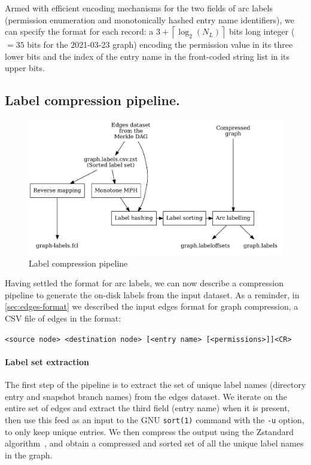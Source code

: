 Armed with efficient encoding mechanisms for the two fields of arc labels
(permission enumeration and monotonically hashed entry name identifiers), we
can specify the format for each record: a $3 +
\left\lceil{\log_2(N_L)}\right\rceil$ bits long integer ($= 35$ bits for
the 2021-03-23 graph) encoding the permission value in its three lower bits and
the index of the entry name in the front-coded string list in its upper bits.

\subsection{Label compression pipeline.}

\begin{figure}
    \centering
    \includegraphics[width=\textwidth]{img/graph-properties/label-compression}
    \caption{Label compression pipeline}%
    \label{fig:label-compression-pipeline}
\end{figure}


Having settled the format for arc labels, we can now describe a compression
pipeline to generate the on-disk labels from the input dataset. As a reminder,
in \cref{sec:edges-format} we described the input edges format for graph
compression, a CSV file of edges in the format:

\texttt{<source node> <destination node> [<entry name> [<permissions>]]<CR>}

\paragraph{Label set extraction}
The first step of the pipeline is to extract the set of unique label names
(directory entry and snapshot branch names) from the edges dataset. We iterate
on the entire set of edges and extract the third field (entry name) when it is
present, then use this feed as an input to the GNU \texttt{sort(1)} command
with the \texttt{-u} option, to only keep unique entries. We then compress the
output using the Zstandard algorithm~\cite{collet2015zstd}, and obtain a
compressed and sorted set of all the unique label names in the graph.

